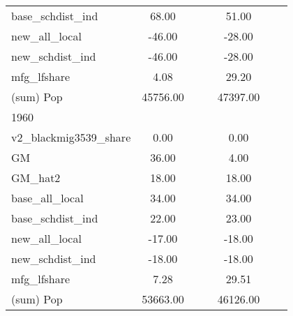 \begin{table}[htbp]
\begin{tabular}{l*{2}{ccc}}
base\_schdist\_ind    &       68.00&            &            &       51.00&            &            \\
new\_all\_local       &      -46.00&            &            &      -28.00&            &            \\
new\_schdist\_ind     &      -46.00&            &            &      -28.00&            &            \\
mfg\_lfshare         &        4.08&            &            &       29.20&            &            \\
(sum) Pop           &    45756.00&            &            &    47397.00&            &            \\
\midrule
1960                &            &            &            &            &            &            \\
v2\_blackmig3539\_share&        0.00&            &            &        0.00&            &            \\
GM                  &       36.00&            &            &        4.00&            &            \\
GM\_hat2             &       18.00&            &            &       18.00&            &            \\
base\_all\_local      &       34.00&            &            &       34.00&            &            \\
base\_schdist\_ind    &       22.00&            &            &       23.00&            &            \\
new\_all\_local       &      -17.00&            &            &      -18.00&            &            \\
new\_schdist\_ind     &      -18.00&            &            &      -18.00&            &            \\
mfg\_lfshare         &        7.28&            &            &       29.51&            &            \\
(sum) Pop           &    53663.00&            &            &    46126.00&            &            \\
\bottomrule
\end{tabular}
\end{table}
